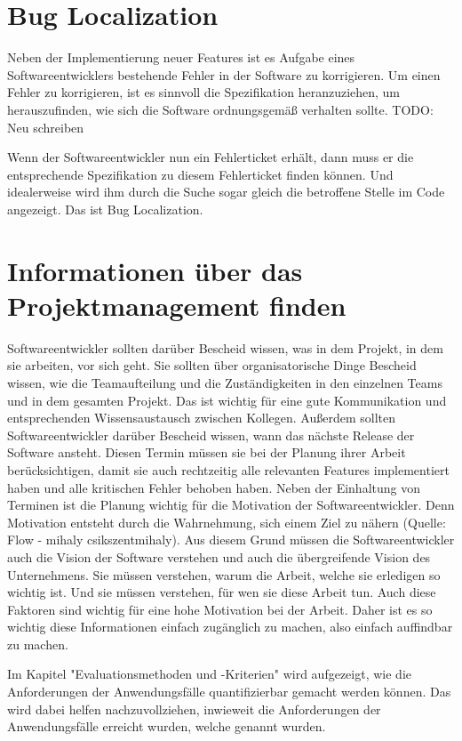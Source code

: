 \section{Bug Localization}
Neben der Implementierung neuer Features ist es Aufgabe eines Softwareentwicklers bestehende Fehler in der Software zu korrigieren.
Um einen Fehler zu korrigieren, ist es sinnvoll die Spezifikation heranzuziehen, um herauszufinden, wie sich die Software ordnungsgemäß verhalten sollte.
TODO: Neu schreiben

Wenn der Softwareentwickler nun ein Fehlerticket erhält, dann muss er die entsprechende Spezifikation zu diesem Fehlerticket finden können.
Und idealerweise wird ihm durch die Suche sogar gleich die betroffene Stelle im Code angezeigt.
Das ist Bug Localization.

\section{Informationen über das Projektmanagement finden}
Softwareentwickler sollten darüber Bescheid wissen, was in dem Projekt, in dem sie arbeiten, vor sich geht.
Sie sollten über organisatorische Dinge Bescheid wissen, wie die Teamaufteilung und die Zuständigkeiten in den einzelnen Teams und in dem gesamten Projekt.
Das ist wichtig für eine gute Kommunikation und entsprechenden Wissensaustausch zwischen Kollegen.
Außerdem sollten Softwareentwickler darüber Bescheid wissen, wann das nächste Release der Software ansteht.
Diesen Termin müssen sie bei der Planung ihrer Arbeit berücksichtigen, damit sie auch rechtzeitig alle relevanten Features implementiert haben und alle kritischen Fehler behoben haben.
Neben der Einhaltung von Terminen ist die Planung wichtig für die Motivation der Softwareentwickler.
Denn Motivation entsteht durch die Wahrnehmung, sich einem Ziel zu nähern (Quelle: Flow - mihaly csikszentmihaly).
Aus diesem Grund müssen die Softwareentwickler auch die Vision der Software verstehen und auch die übergreifende Vision des Unternehmens.
Sie müssen verstehen, warum die Arbeit, welche sie erledigen so wichtig ist.
Und sie müssen verstehen, für wen sie diese Arbeit tun.
Auch diese Faktoren sind wichtig für eine hohe Motivation bei der Arbeit.
Daher ist es so wichtig diese Informationen einfach zugänglich zu machen, also einfach auffindbar zu machen.

Im Kapitel "Evaluationsmethoden und -Kriterien" wird aufgezeigt, wie die Anforderungen der Anwendungsfälle quantifizierbar gemacht werden können.
Das wird dabei helfen nachzuvollziehen, inwieweit die Anforderungen der Anwendungsfälle erreicht wurden, welche genannt wurden.
